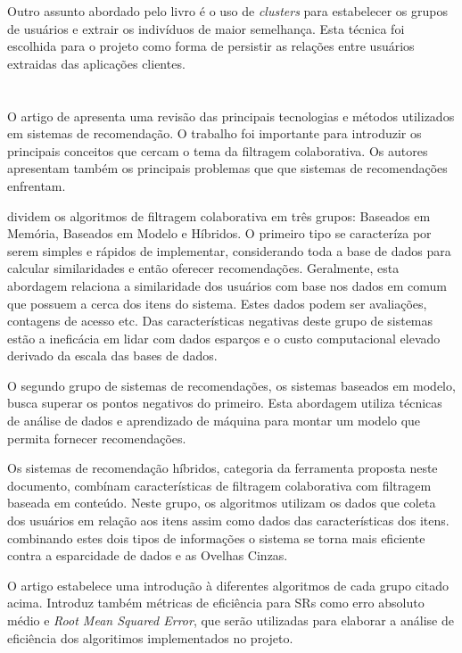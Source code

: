 \documentclass[
	12pt,				%
    oneside,			%
	a4paper,			%
	english,			%
	french,				%
	spanish,			%
	brazil,				%
	]{abntex2}
\begin{document}
Outro assunto abordado pelo livro é o uso de \textit{clusters} para estabelecer os grupos de usuários e extrair os indivíduos de maior semelhança. Esta técnica 
foi escolhida para o projeto como forma de persistir as relações entre usuários extraidas das aplicações clientes.

\section{}
O artigo de  apresenta uma revisão das principais tecnologias e métodos utilizados em sistemas de recomendação. O trabalho foi
importante para introduzir os principais conceitos que cercam o tema da filtragem colaborativa. Os autores apresentam também os principais problemas que 
que sistemas de recomendações enfrentam.

 dividem os algoritmos de filtragem colaborativa em três grupos: Baseados em Memória, Baseados em Modelo e Híbridos. O primeiro 
tipo se caracteríza por serem simples e rápidos de implementar, considerando toda a base de dados para calcular similaridades e então oferecer recomendações.
Geralmente, esta abordagem relaciona a similaridade dos usuários com base nos dados em comum que possuem a cerca dos itens do sistema. Estes dados podem ser
avaliações, contagens de acesso etc. Das características negativas deste grupo de sistemas estão a ineficácia em lidar com dados esparços e o custo computacional
elevado derivado da escala das bases de dados. 

O segundo grupo de sistemas de recomendações, os sistemas baseados em modelo, busca superar os pontos negativos do primeiro. Esta abordagem utiliza técnicas de
análise de dados e aprendizado de máquina para montar um modelo que permita fornecer recomendações. 

Os sistemas de recomendação híbridos, categoria da ferramenta proposta neste documento, combínam características de filtragem colaborativa com filtragem baseada
em conteúdo. Neste grupo, os algoritmos utilizam os dados que coleta dos usuários em relação aos itens assim como dados das características dos itens.
combinando estes dois tipos de informações o sistema se torna mais eficiente contra a esparcidade de dados e as Ovelhas Cinzas.

O artigo estabelece uma introdução à diferentes algoritmos de cada grupo citado acima. Introduz também métricas de eficiência para SRs como
erro absoluto médio e \textit{Root Mean Squared Error}, que serão utilizadas para elaborar a análise de eficiência dos algoritimos implementados no projeto.
\end{document}
